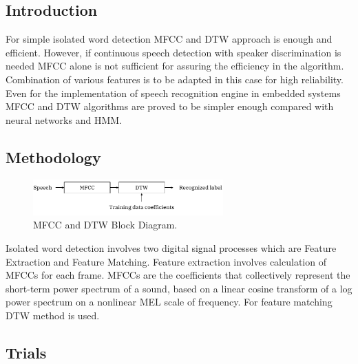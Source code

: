 \documentclass[12pt, a4paper, twoside]{report}
\begin{document}
\subsection{Introduction}
For simple isolated word detection MFCC and DTW approach is enough and efficient. However, if continuous speech detection with speaker discrimination is needed MFCC alone is not sufficient for assuring the efficiency in the algorithm.  Combination of various features is to be adapted in this case for high reliability. Even for the implementation of speech recognition engine in embedded systems MFCC and DTW algorithms are proved to be simpler enough compared with neural networks and HMM. 
\subsection{Methodology}
\begin{figure}[!h]
	\centering
	\includegraphics[width=0.65\textwidth]
	{images/chapter5/dtw-blocks}
	\caption{MFCC and DTW Block Diagram.}
	\label{fig:dtw-blocks}
\end{figure}

Isolated word detection involves two digital signal processes which are Feature Extraction and Feature Matching.  Feature extraction involves calculation of MFCCs for each frame. MFCCs are the coefficients that collectively represent the short-term power spectrum of a sound, based on a linear cosine transform of a log power spectrum on a nonlinear MEL scale of frequency. For feature matching DTW method is used.

\subsection{Trials}
\end{document}
